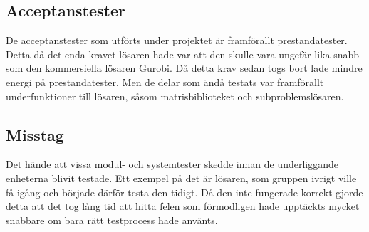 	
	\subsection{Acceptanstester}
	De acceptanstester som utförts under projektet är framförallt prestandatester. Detta då det enda kravet lösaren hade var att den skulle vara ungefär lika snabb som den kommersiella lösaren Gurobi. Då detta krav sedan togs bort lade mindre energi på prestandatester. Men de delar som ändå testats var framförallt underfunktioner till lösaren, såsom matrisbiblioteket och subproblemslösaren.
	
	\subsection{Misstag}
	Det hände att vissa modul- och systemtester skedde innan de underliggande enheterna blivit testade. Ett exempel på det är lösaren, som gruppen ivrigt ville få igång och började därför testa den tidigt. Då den inte fungerade korrekt gjorde detta att det tog lång tid att hitta felen som förmodligen hade upptäckts mycket snabbare om bara rätt testprocess hade använts.
	
	